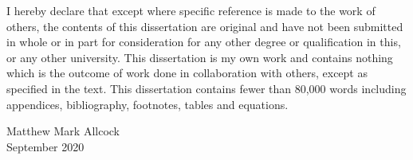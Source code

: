 \begin{declaration}
I hereby declare that except where specific reference is made to the work of others, the contents of this dissertation are original and have not been submitted in whole or in part for consideration for any other degree or qualification in this, or any other university. This dissertation is my own work and contains nothing which is the outcome of work done in collaboration with others, except as specified in the text. This dissertation contains fewer than 80,000 words including appendices, bibliography, footnotes, tables and equations.

\begin{flushright}
	Matthew Mark Allcock
	\\
	September 2020
\end{flushright}
\end{declaration}